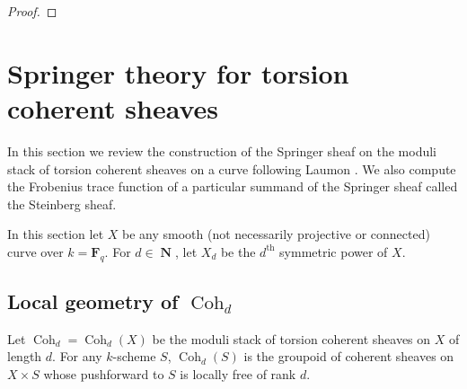 \documentclass[reqno]{amsart}
\numberwithin{equation}{section}
\newcommand{\F}{\mathbf{F}}
\newcommand{\mrm}[1]{\mathrm{#1}}
\DeclareMathOperator{\N}{\mathbf{N}}
\DeclareMathOperator{\Coh}{Coh}
\DeclareMathOperator{\Den}{Den}
\newcommand\ot{\otimes}
\newcommand{\s}{\sigma}
\newcommand\cE{\mathcal{E}}
\newcommand\cO{\mathcal{O}}
\newcommand\cQ{\mathcal{Q}}
\theoremstyle{remark}
\numberwithin{equation}{section}
\begin{document}
\begin{proof}
\end{proof}







\section{Springer theory for torsion coherent sheaves}\label{sec: springer}
In this section we review the construction of the Springer sheaf on the moduli stack of torsion coherent sheaves on a curve following Laumon \cite{Lau87}. We also compute the Frobenius trace function of a particular summand of the Springer sheaf called the Steinberg sheaf. 

In this section let $X$ be any smooth (not necessarily projective or connected) curve over $k=\F_{q}$.  For $d\in \N$, let $X_{d}$ be the $d^{\mrm{th}}$ symmetric power of $X$.

\subsection{Local geometry of $\Coh_{d}$}\label{ss:Coh loc}
Let $\Coh_{d}=\Coh_{d}(X)$ be the moduli stack of torsion coherent sheaves on $X$ of length $d$. For any $k$-scheme $S$, $\Coh_d(S)$ is the groupoid of coherent sheaves on $X \times S$ whose pushforward to $S$ is locally free of rank $d$. 
\end{document}

